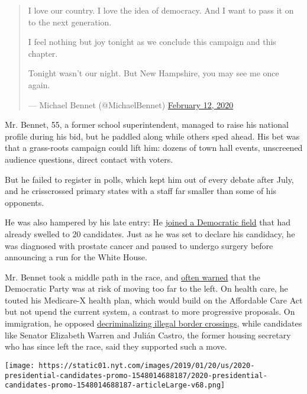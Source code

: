 \begin{quote}
I love our country. I love the idea of democracy. And I want to pass it
on to the next generation.

I feel nothing but joy tonight as we conclude this campaign and this
chapter.

Tonight wasn't our night. But New Hampshire, you may see me once again.

--- Michael Bennet (@MichaelBennet)
\href{https://twitter.com/MichaelBennet/status/1227420272476684290?ref_src=twsrc\%5Etfw}{February
12, 2020}
\end{quote}

Mr. Bennet, 55, a former school superintendent, managed to raise his
national profile during his bid, but he paddled along while others sped
ahead. His bet was that a grass-roots campaign could lift him: dozens of
town hall events, unscreened audience questions, direct contact with
voters.

But he failed to register in polls, which kept him out of every debate
after July, and he crisscrossed primary states with a staff far smaller
than some of his opponents.

He was also hampered by his late entry: He
\href{https://www.nytimes.com/2019/05/02/us/michael-bennet-president-2020.html}{joined
a Democratic field} that had already swelled to 20 candidates. Just as
he was set to declare his candidacy, he was diagnosed with prostate
cancer and paused to undergo surgery before announcing a run for the
White House.

Mr. Bennet took a middle path in the race, and
\href{https://coloradosun.com/2019/07/31/michael-bennet-president-2020-democratic-primary/}{often
warned} that the Democratic Party was at risk of moving too far to the
left. On health care, he touted his Medicare-X health plan, which would
build on the Affordable Care Act but not upend the current system, a
contrast to more progressive proposals. On immigration, he opposed
\href{https://www.nytimes.com/2019/07/31/us/border-crossing-decriminalization.html}{decriminalizing
illegal border crossings}, while candidates like Senator Elizabeth
Warren and Julián Castro, the former housing secretary who has since
left the race, said they supported such a move.

\href{https://www.nytimes.com/interactive/2019/us/politics/2020-presidential-candidates.html}{}

\texttt{[image: https://static01.nyt.com/images/2019/01/20/us/2020-presidential-candidates-promo-1548014688187/2020-presidential-candidates-promo-1548014688187-articleLarge-v68.png]}

